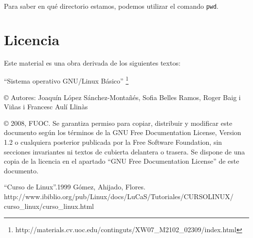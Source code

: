 \documentclass[12pt]{article}
\begin{document}
Para saber en qué directorio estamos, podemos utilizar el comando \texttt{pwd}.



\section{Licencia}

Este material es una obra derivada de los siguientes textos:

``Sistema operativo GNU/Linux Básico'' \footnote{http://materials.cv.uoc.edu/continguts/XW07\_M2102\_02309/index.html}

© Autores: Joaquín López Sánchez-Montañés, Sofia Belles Ramos, Roger Baig i Viñas i Francesc Aulí Llinàs

© 2008, FUOC. Se garantiza permiso para copiar, distribuir y modificar este documento según los
términos de la GNU Free Documentation License, Version 1.2 o cualquiera posterior publicada por la
Free Software Foundation, sin secciones invariantes ni textos de cubierta delantera o trasera. Se dispone
de una copia de la licencia en el apartado ``GNU Free Documentation License'' de este documento.

\begin{thebibliography}{1}
 ``Curso de Linux''.1999 Gómez, Ahijado, Flores.\\ 
http://www.ibiblio.org/pub/Linux/docs/LuCaS/Tutoriales/CURSOLINUX/\\curso\_linux/curso\_linux.html



\end{thebibliography}
\end{document}
